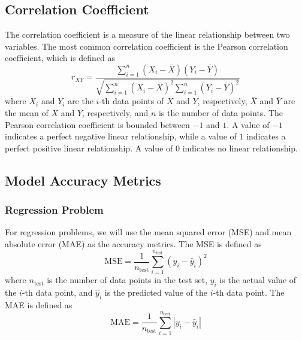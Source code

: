 \documentclass[conf]{new-aiaa}
\begin{document}
\subsection{Correlation Coefficient}
The correlation coefficient is a measure of the linear relationship between two variables. The most common correlation coefficient is the Pearson correlation coefficient, which is defined as
\begin{equation} \label{eq:pearsoncorr}
    r_{XY} = \frac{\sum_{i=1}^n \left(X_i - \bar{X}\right)\left(Y_i - \bar{Y}\right)}{\sqrt{\sum_{i=1}^n \left(X_i - \bar{X}\right)^2 \sum_{i=1}^n \left(Y_i - \bar{Y}\right)^2}}
\end{equation}
where $X_i$ and $Y_i$ are the $i$-th data points of $X$ and $Y$, respectively, $\bar{X}$ and $\bar{Y}$ are the mean of $X$ and $Y$, respectively, and $n$ is the number of data points. The Pearson correlation coefficient is bounded between $-1$ and $1$. A value of $-1$ indicates a perfect negative linear relationship, while a value of $1$ indicates a perfect positive linear relationship. A value of $0$ indicates no linear relationship.

\subsection{Model Accuracy Metrics}
\subsubsection{Regression Problem}
For regression problems, we will use the mean squared error (MSE) and mean absolute error (MAE) as the accuracy metrics. The MSE is defined as
\begin{equation} \label{eq:mse}
    \textrm{MSE} = \frac{1}{n_\textrm{test}} \sum_{i=1}^{n_\textrm{test}} \left(y_i - \hat{y}_i\right)^2
\end{equation}
where $n_\textrm{test}$ is the number of data points in the test set, $y_i$ is the actual value of the $i$-th data point, and $\hat{y}_i$ is the predicted value of the $i$-th data point. The MAE is defined as
\begin{equation} \label{eq:mae}
    \textrm{MAE} = \frac{1}{n_\textrm{test}} \sum_{i=1}^{n_\textrm{test}} \left|y_i - \hat{y}_i\right|
\end{equation}
\end{document}
